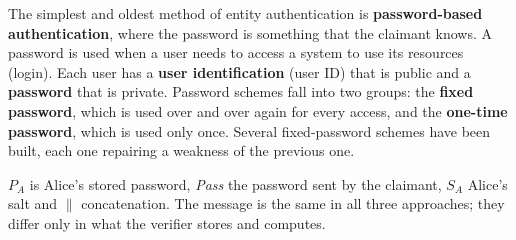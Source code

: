 The simplest and oldest method of entity authentication is \textbf{password-based authentication}, where the password is something that the claimant knows. A password is used when a user needs to access a system to use its resources (login). Each user has a \textbf{user identification} (user ID) that is public and a \textbf{password} that is private. Password schemes fall into two groups: the \textbf{fixed password}, which is used over and over again for every access, and the \textbf{one-time password}, which is used only once. Several fixed-password schemes have been built, each one repairing a weakness of the previous one.

\begin{center}
\end{center}
$P_A$ is Alice's stored password, \textit{Pass} the password sent by the claimant, $S_A$ Alice's salt and $\|$ concatenation. The message is the same in all three approaches; they differ only in what the verifier stores and computes.


